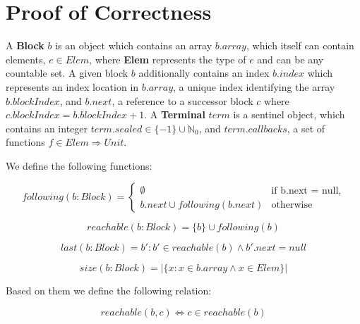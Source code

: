 \documentclass[runningheads,a4paper]{llncs}
\begin{document}



\appendix
\section{Proof of Correctness}


\setcounter{lemma}{0}
\setcounter{theorem}{0}
\setcounter{corollary}{0}
\setcounter{definition}{0}




\begin{definition}
A \textbf{Block} $b$ is an object which
contains an array $b.array$, which itself can contain elements, $e \in Elem$,
where \textbf{Elem} represents the type of $e$ and can be any countable set. A
given block $b$ additionally contains an index $b.index$ which represents an
index location in $b.array$, a unique index identifying the array
$b.blockIndex$, and $b.next$, a reference to a successor block $c$ where
$c.blockIndex = b.blockIndex + 1$. A \textbf{Terminal} $term$ is a sentinel
object, which contains an integer $term.sealed \in \{-1\} \cup \mathbb{N}_0$, and
$term.callbacks$, a set of functions $f \in Elem \Rightarrow Unit$.

We define the following functions:

\begin{equation*}
following(b: Block) = 
\begin{cases}
\emptyset & \text{if b.next = null,}
\\
b.next \cup following(b.next) & \text{otherwise}
\end{cases}
\end{equation*}

\begin{equation*}
reachable(b: Block) = \{ b \} \cup following(b)
\end{equation*}

\begin{equation*}
last(b: Block) = b' : b' \in reachable(b) \wedge b'.next = null
\end{equation*}

\begin{equation*}
size(b: Block) = | \{ x : x \in b.array \wedge x \in Elem \} |
\end{equation*}

Based on them we define the following relation:

\begin{equation*}
reachable(b, c) \Leftrightarrow c \in reachable(b)
\end{equation*}
\end{definition}
\end{document}
